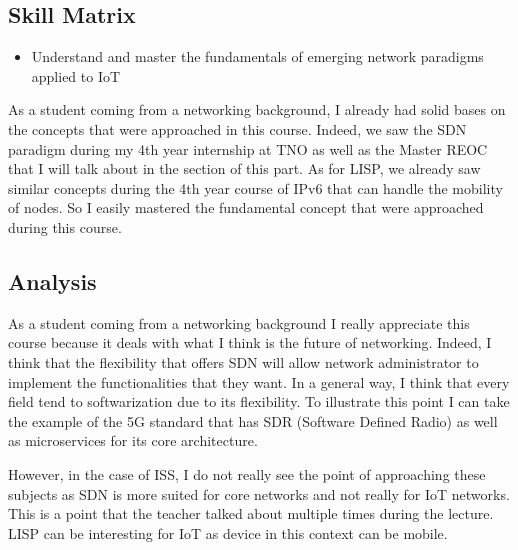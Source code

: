 \subsection{Skill Matrix}

\begin{itemize}
    \item Understand  and master the fundamentals of emerging network paradigms applied to IoT
\end{itemize}

As a student coming from a networking background, I already had solid bases on the concepts that were approached in this course. Indeed, we saw the SDN paradigm during my 4th year internship at TNO as well as the Master REOC that I will talk about in the section of this part. As for LISP, we already saw similar concepts during the 4th year course of IPv6 that can handle the mobility of nodes. So I easily mastered the fundamental concept that were approached during this course.

\subsection{Analysis}

As a student coming from a networking background I really appreciate this course because it deals with what I think is the future of networking. Indeed, I think that the flexibility that offers SDN will allow network administrator to implement the functionalities that they want. In a general way, I think that every field tend to softwarization due to its flexibility. To illustrate this  point I can take the example of the 5G standard that has SDR (Software Defined Radio) as well as microservices for its core architecture. 
\\\par
However, in the case of ISS, I do not really see the point of approaching these subjects as SDN is more suited for core networks and not really for IoT networks. This is a point that the teacher talked about multiple times during the lecture. LISP can be interesting for IoT as device in this context can be mobile.